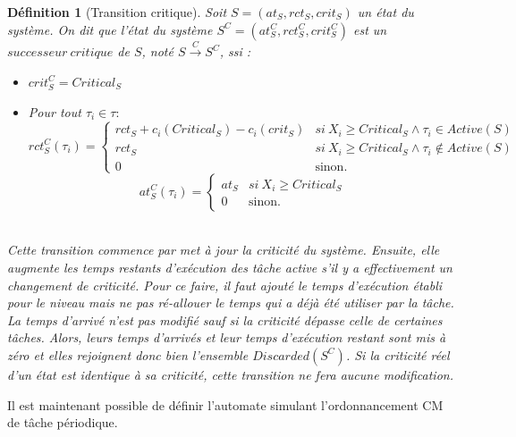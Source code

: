\documentclass[12pt,a4paper,oneside]{book}
\theoremstyle{break}
\newtheorem{defin}{Définition}[chapter]
\theoremstyle{breakplain}
\begin{document}
\begin{defin}[Transition critique]
Soit $S = (at_S, rct_S, crit_S)$ un état du système. On dit que l'état du système $S^C = (at_S^C, rct_S^C, crit_S^C)$ est un $successeur\ critique$ de $S$, noté $S\xrightarrow{C}S^C$, ssi :
\begin{itemize}
\item $crit_S^C = Critical_S$
\item Pour tout $\tau_i \in \tau :$
$$ rct_S^C(\tau_i) = \left\{
    \begin{array}{ll}
        rct_S+c_i(Critical_S)-c_i(crit_S) & si\ X_i\geq Critical_S \wedge \tau_i \in Active(S) \\
        rct_S & si\ X_i\geq Critical_S \wedge \tau_i \notin Active(S) \\
        0 & \mbox{sinon.}
    \end{array}
\right.
$$
$$ at_S^C(\tau_i) = \left\{
    \begin{array}{ll}
        at_S & si\ X_i\geq Critical_S \\
        0 & \mbox{sinon.}
    \end{array}
\right.
$$\\
\end{itemize}
Cette transition commence par met à jour la criticité du système. Ensuite, elle augmente les temps restants d'exécution des tâche active s'il y a effectivement un changement de criticité. Pour ce faire, il faut ajouté le temps d'exécution établi pour le niveau mais ne pas ré-allouer le temps qui a déjà été utiliser par la tâche.\\
La temps d'arrivé n'est pas modifié sauf si la criticité dépasse celle de certaines tâches. Alors, leurs temps d'arrivés et leur temps d'exécution restant sont mis à zéro et elles rejoignent donc bien l'ensemble $Discarded(S^C)$. Si la criticité réel d'un état est identique à sa criticité, cette transition ne fera aucune modification.
\end{defin}

Il est maintenant possible de définir l'automate simulant l'ordonnancement CM de tâche périodique.
\end{document}
